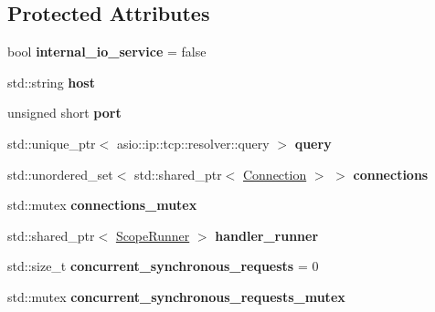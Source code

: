 \subsection*{Protected Attributes}
\begin{DoxyCompactItemize}
\item 
bool {\bfseries internal\+\_\+io\+\_\+service} = false\hypertarget{classSimpleWeb_1_1ClientBase_a180f9536bdb0559518c47bc7382e3b8e}{}\label{classSimpleWeb_1_1ClientBase_a180f9536bdb0559518c47bc7382e3b8e}

\item 
std\+::string {\bfseries host}\hypertarget{classSimpleWeb_1_1ClientBase_a4436f29ffdce0b29b210cbecd972ffef}{}\label{classSimpleWeb_1_1ClientBase_a4436f29ffdce0b29b210cbecd972ffef}

\item 
unsigned short {\bfseries port}\hypertarget{classSimpleWeb_1_1ClientBase_aadd3336b64a1f8d559af656554ddd0e9}{}\label{classSimpleWeb_1_1ClientBase_aadd3336b64a1f8d559af656554ddd0e9}

\item 
std\+::unique\+\_\+ptr$<$ asio\+::ip\+::tcp\+::resolver\+::query $>$ {\bfseries query}\hypertarget{classSimpleWeb_1_1ClientBase_a5af8c922595244bf0805221a0ca5d170}{}\label{classSimpleWeb_1_1ClientBase_a5af8c922595244bf0805221a0ca5d170}

\item 
std\+::unordered\+\_\+set$<$ std\+::shared\+\_\+ptr$<$ \hyperlink{classSimpleWeb_1_1ClientBase_1_1Connection}{Connection} $>$ $>$ {\bfseries connections}\hypertarget{classSimpleWeb_1_1ClientBase_a5bce127c1c076ca387d267493b332699}{}\label{classSimpleWeb_1_1ClientBase_a5bce127c1c076ca387d267493b332699}

\item 
std\+::mutex {\bfseries connections\+\_\+mutex}\hypertarget{classSimpleWeb_1_1ClientBase_a7a0ce858201c549db475d423f6b0840d}{}\label{classSimpleWeb_1_1ClientBase_a7a0ce858201c549db475d423f6b0840d}

\item 
std\+::shared\+\_\+ptr$<$ \hyperlink{classSimpleWeb_1_1ScopeRunner}{Scope\+Runner} $>$ {\bfseries handler\+\_\+runner}\hypertarget{classSimpleWeb_1_1ClientBase_a6be61066a0d702adc659c3f66c8110b5}{}\label{classSimpleWeb_1_1ClientBase_a6be61066a0d702adc659c3f66c8110b5}

\item 
std\+::size\+\_\+t {\bfseries concurrent\+\_\+synchronous\+\_\+requests} = 0\hypertarget{classSimpleWeb_1_1ClientBase_af9da5f0f07b25ffb320c4cfb7f0af55f}{}\label{classSimpleWeb_1_1ClientBase_af9da5f0f07b25ffb320c4cfb7f0af55f}

\item 
std\+::mutex {\bfseries concurrent\+\_\+synchronous\+\_\+requests\+\_\+mutex}\hypertarget{classSimpleWeb_1_1ClientBase_a4b7ecf293ab618042f99a3ac2d6bf2c6}{}\label{classSimpleWeb_1_1ClientBase_a4b7ecf293ab618042f99a3ac2d6bf2c6}

\end{DoxyCompactItemize}



